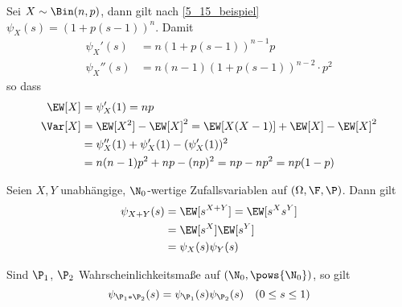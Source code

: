 \begin{beispiel}
	\label{5_17_beispiel}
	Sei $X \sim \Bin(n,p)$, dann gilt nach \cref{5_15_beispiel} $\psi_X (s) = (1+p(s-1))^n$. Damit 
	\begin{equation*}
	\begin{aligned}
		\psi_X'  (s) &= n (1+p(s-1))^{n-1} p \\
		\psi_X'' (s) &= n (n-1) (1+p(s-1))^{n-2}\cdot p^2
	\end{aligned}
	\end{equation*}
	so dass
	\begin{equation*}
	\begin{aligned}
		\EW[X]  &= \psi'_X (1) = np \\
		\Var[X] &= \EW[X^2] - \EW[X]^2 = \EW[X(X-1)] + \EW[X] - \EW[X]^2 \\
		&= \psi_X''(1) + \psi_X'(1) - (\psi'_X(1))^2 \\
		&= n (n-1) p^2 + np - (np)^2 = np - np^2 = np(1-p)
	\end{aligned}
	\end{equation*}
\end{beispiel}

\begin{proposition}
	\label{5_18_proposition}
	Seien $X,Y$ unabhängige, $\N_0$-wertige Zufallsvariablen auf $(\Omega,\F,\P)$. Dann gilt
	\begin{equation*}
	\begin{aligned}
		\psi_{X+Y}(s) &= \EW[s^{X+Y}] = \EW[s^X s^Y] \\
		&= \EW[s^X] \EW[s^Y] \\
		&= \psi_X(s) \psi_Y(s)
	\end{aligned}
	\end{equation*}
\end{proposition}

\begin{proposition}
	\label{5_19_proposition}
	Sind $\P_1$, $\P_2$ Wahrscheinlichkeitsmaße auf $(\N_0, \pows{\N_0})$, so gilt
	\begin{equation*}
	\psi_{\P_1 \ast \P_2}(s) = \psi_{\P_1}(s) \psi_{\P_2}(s) \quad (0 \le s \le 1)
	\end{equation*}
\end{proposition}